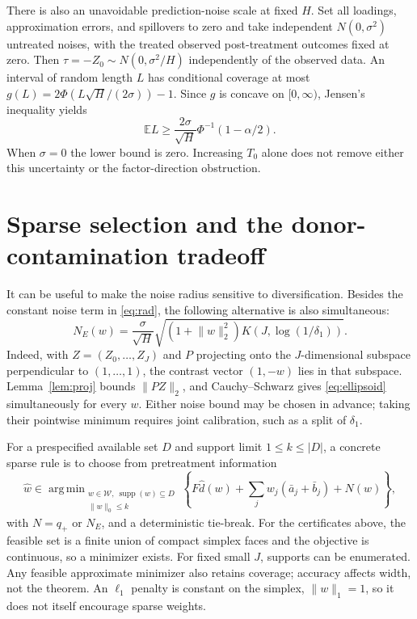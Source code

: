 \documentclass[11pt,a4paper]{article}
\newcommand{\E}{\mathbb E}
\newcommand{\W}{\mathcal W}
\newcommand{\norm}[1]{\lVert#1\rVert}
\DeclareMathOperator{\supp}{supp}
\DeclareMathOperator*{\argmin}{arg\,min}
\begin{document}
There is also an unavoidable prediction-noise scale at fixed $H$. Set all loadings, approximation errors, and spillovers to zero and take independent $N(0,\sigma^2)$ untreated noises, with the treated observed post-treatment outcomes fixed at zero. Then $\tau=-Z_0\sim N(0,\sigma^2/H)$ independently of the observed data. An interval of random length $L$ has conditional coverage at most
$g(L)=2\Phi(L\sqrt H/(2\sigma))-1$. Since $g$ is concave on $[0,\infty)$, Jensen's inequality yields
\begin{equation}\label{eq:noise-lower}
 \E L\ge\frac{2\sigma}{\sqrt H}\Phi^{-1}(1-\alpha/2).
\end{equation}
When $\sigma=0$ the lower bound is zero. Increasing $T_0$ alone does not remove either this uncertainty or the factor-direction obstruction.

\section{Sparse selection and the donor-contamination tradeoff}
It can be useful to make the noise radius sensitive to diversification. Besides the constant noise term in \eqref{eq:rad}, the following alternative is also simultaneous:
\begin{equation}\label{eq:ellipsoid}
 N_E(w)=\frac{\sigma}{\sqrt H}
 \sqrt{(1+\norm w_2^2)K(J,\log(1/\delta_1))}.
\end{equation}
Indeed, with $Z=(Z_0,\ldots,Z_J)$ and $P$ projecting onto the $J$-dimensional subspace perpendicular to $(1,\ldots,1)$, the contrast vector $(1,-w)$ lies in that subspace. Lemma~\ref{lem:proj} bounds $\norm{PZ}_2$, and Cauchy--Schwarz gives \eqref{eq:ellipsoid} simultaneously for every $w$. Either noise bound may be chosen in advance; taking their pointwise minimum requires joint calibration, such as a split of $\delta_1$.

For a prespecified available set $D$ and support limit $1\le k\le|D|$, a concrete sparse rule is to choose from pretreatment information
\begin{equation}\label{eq:sparselaw}
 \widehat w\in\argmin_{\substack{w\in\W,\ \supp(w)\subseteq D\\
                                    \norm w_0\le k}}
 \left\{F\widehat d(w)+\sum_jw_j(\bar a_j+\bar b_j)+N(w)\right\},
\end{equation}
with $N=q_+$ or $N_E$, and a deterministic tie-break. For the certificates above, the feasible set is a finite union of compact simplex faces and the objective is continuous, so a minimizer exists. For fixed small $J$, supports can be enumerated. Any feasible approximate minimizer also retains coverage; accuracy affects width, not the theorem. An $\ell_1$ penalty is constant on the simplex, $\norm w_1=1$, so it does not itself encourage sparse weights.
\end{document}
